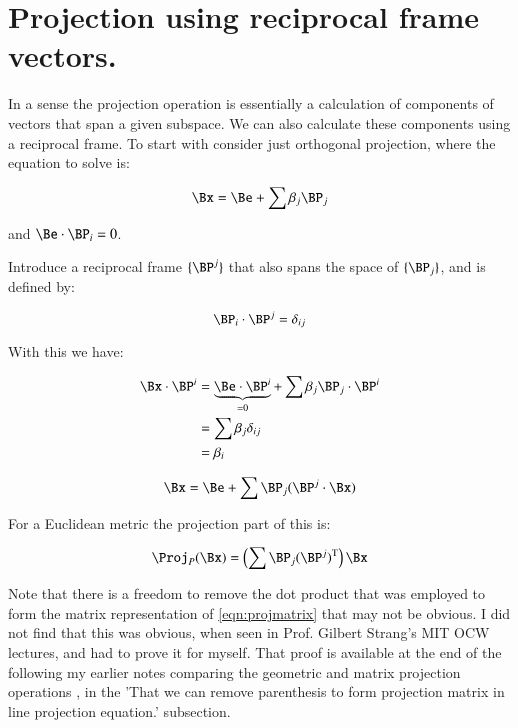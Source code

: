 \documentclass{article}      %
\newcommand{\T}[0]{\text{T}}
\begin{document}
\section{ Projection using reciprocal frame vectors. }


In a sense the projection operation is essentially a calculation of components of vectors that span a given subspace.  We can also calculate these components using a reciprocal frame.  To start with consider
just orthogonal projection, where the equation to solve is:

\begin{equation}
\Bx = \Be + \sum \beta_j \BP_j
\end{equation}

and $\Be \cdot \BP_i = 0$.

Introduce a reciprocal frame $\{\BP^j\}$ that also spans the space of $\{\BP_j\}$, and is defined by:

\[
\BP_i \cdot \BP^j = \delta_{ij}
\]

With this we have:

\begin{align*}
\Bx \cdot \BP^i
&= \underbrace{\Be \cdot \BP^i}_{=0} + \sum \beta_j \BP_j \cdot \BP^i \\
&= \sum \beta_j \delta_{ij} \\
&= \beta_i \\
\end{align*}

\begin{equation*}
\Bx = \Be + \sum \BP_j (\BP^j \cdot \Bx)
\end{equation*}

For a Euclidean metric the projection part of this is:

\begin{equation}\label{eqn:projmatrix}
\Proj_P(\Bx) = \left( \sum \BP_j (\BP^j)^\T \right) \Bx
\end{equation}

Note that there is a freedom to remove the dot product that was employed
to form the matrix representation of \ref{eqn:projmatrix} that may not be obvious.
I did not find that this 
was obvious, when seen in Prof. Gilbert Strang's MIT OCW lectures, and 
had to prove it for myself.  That proof is available at the end of the 
following
my earlier notes
\cite{PJMatrixReview}
comparing the geometric and matrix projection operations 
, in the 'That we can remove parenthesis to form projection matrix in line projection equation.' subsection.
\end{document}
